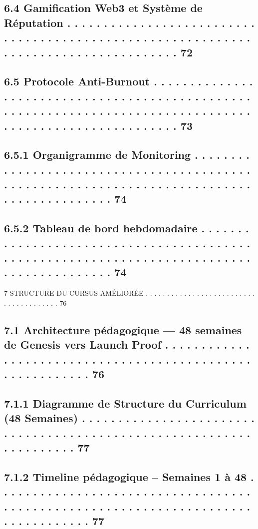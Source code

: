\documentclass[12pt,landscape,a4paper]{article}
\begin{document}
\subsection{6.4     Gamification Web3 et Système de Réputation . . . . . . . . . . . . . . . . . . . . . . . . . . . . . . . . . . . . . . . . . . . . . . . . . . . . . . . . . . . . . . . . . . . . . . . . . . . . . . . . . . . . 72}
\subsection{6.5     Protocole Anti-Burnout . . . . . . . . . . . . . . . . . . . . . . . . . . . . . . . . . . . . . . . . . . . . . . . . . . . . . . . . . . . . . . . . . . . . . . . . . . . . . . . . . . . . . . . . . . . . . . . . . . . . . . . . . . 73}
\subsection{6.5.1              Organigramme de Monitoring . . . . . . . . . . . . . . . . . . . . . . . . . . . . . . . . . . . . . . . . . . . . . . . . . . . . . . . . . . . . . . . . . . . . . . . . . . . . . . . . . . . . . . . . . . . 74}
\subsection{6.5.2              Tableau de bord hebdomadaire . . . . . . . . . . . . . . . . . . . . . . . . . . . . . . . . . . . . . . . . . . . . . . . . . . . . . . . . . . . . . . . . . . . . . . . . . . . . . . . . . . . . . . . . . . 74}
\vspace{0.5em}
7     STRUCTURE DU CURSUS AMÉLIORÉE . . . . . . . . . . . . . . . . . . . . . . . . . . . . . . . . . . . . . . . 76\\
\subsection{7.1     Architecture pédagogique — 48 semaines de Genesis vers Launch Proof . . . . . . . . . . . . . . . . . . . . . . . . . . . . . . . . . . . . . . . . . . . . . . . . . . . . . . . . . . 76}
\subsection{7.1.1              Diagramme de Structure du Curriculum (48 Semaines) . . . . . . . . . . . . . . . . . . . . . . . . . . . . . . . . . . . . . . . . . . . . . . . . . . . . . . . . . . . . . . . . . . . . 77}
\subsection{7.1.2              Timeline pédagogique – Semaines 1 à 48 . . . . . . . . . . . . . . . . . . . . . . . . . . . . . . . . . . . . . . . . . . . . . . . . . . . . . . . . . . . . . . . . . . . . . . . . . . . . . . . . . 77}
\end{document}
